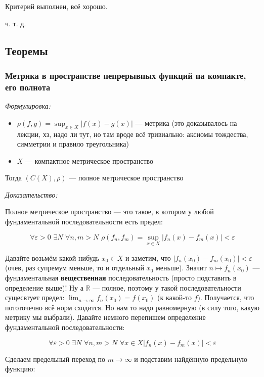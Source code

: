 \documentclass{article}
\def\dbl{\,\,}
\begin{document}
Критерий выполнен, всё хорошо.

ч. т. д.

\newpage

\subsection{Теоремы}

\subsubsection{Метрика в пространстве непрерывных функций на компакте, его полнота}
\textit{Формулировка:}

\begin{itemize}
    \item $\rho(f, g) = \sup_{x \in X} |f(x) - g(x)|$ --- метрика (это доказывалось на лекции, хз, надо ли тут, но там вроде всё тривиально: аксиомы тождества, симметрии и правило треугольника) 
    \item $X$ --- компактное метрическое пространство
\end{itemize}

Тогда $\left(C(X), \rho \right)$ --- полное метрическое пространство

\textit{Доказательство:}

Полное метрическое пространство --- это такое, в котором у любой фундаментальной последовательности есть предел:

\[\forall \varepsilon > 0 \dbl \exists N \dbl \forall n, m > N \dbl \rho(f_n, f_m) = \sup_{x \in X}|f_n(x) - f_m(x)| < \varepsilon\]

Давайте возьмём какой-нибудь $x_0 \in X$ и заметим, что $|f_n(x_0) - f_m(x_0)| < \varepsilon$ (очев, раз супремум меньше, то и отдельный $x_0$ меньше). Значит $n \mapsto f_n(x_0)$ --- фундаментальная \textbf{вещественная} последовательность (просто подставить в определение выше)! Ну а $\mathbb{R}$ --- полное, поэтому у такой последовательности сущесвтует предел: $\lim_{n \rightarrow \infty} f_n(x_0) = f(x_0)$ (к какой-то $f$). Получается, что пототочечно всё норм сходится. Но нам то надо равномерную (в силу того, какую метрику мы выбрали). Давайте немного перепишем определение фундаментальной последовательности:

\[\forall \varepsilon > 0 \dbl \exists N \dbl \forall n, m > N \dbl \forall x \in X |f_n(x) - f_m(x)| < \varepsilon\]

Сделаем предельный переход по $m \rightarrow \infty$ и подставим найдённую предельную функцию: 
\end{document}
